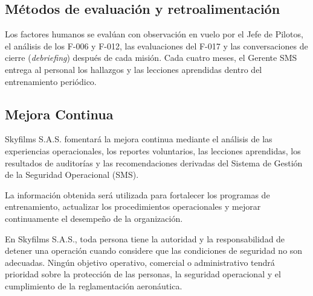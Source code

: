 \subsection{Métodos de evaluación y retroalimentación}

Los factores humanos se evalúan con observación en vuelo por el Jefe de Pilotos, el análisis de los F-006 y F-012, las evaluaciones del F-017 y las conversaciones de cierre (\textit{debriefing}) después de cada misión. Cada cuatro meses, el Gerente SMS entrega al personal los hallazgos y las lecciones aprendidas dentro del entrenamiento periódico.

\subsection{Mejora Continua}

Skyfilms S.A.S. fomentará la mejora continua mediante el análisis de las experiencias operacionales, los reportes voluntarios, las lecciones aprendidas, los resultados de auditorías y las recomendaciones derivadas del Sistema de Gestión de la Seguridad Operacional (SMS).

La información obtenida será utilizada para fortalecer los programas de entrenamiento, actualizar los procedimientos operacionales y mejorar continuamente el desempeño de la organización.


\begin{tcolorbox}[
title=Principio de Seguridad Operacional,
colback=gray!5,
colframe=black]

En Skyfilms S.A.S., toda persona tiene la autoridad y la responsabilidad de detener una operación cuando considere que las condiciones de seguridad no son adecuadas. Ningún objetivo operativo, comercial o administrativo tendrá prioridad sobre la protección de las personas, la seguridad operacional y el cumplimiento de la reglamentación aeronáutica.

\end{tcolorbox}
